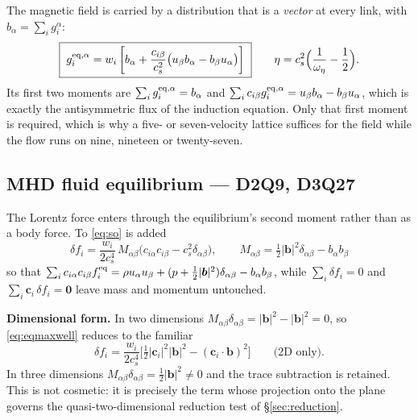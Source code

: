 \documentclass[11pt,a4paper]{article}
\newcommand{\cs}{c_s}
\newcommand{\ci}{\bm{c}_i}
\newcommand{\bb}{\bm{b}}
\begin{document}
The magnetic field is carried by a distribution that is a \emph{vector} at every
link, with $b_\alpha=\sum_i g_i^\alpha$:
\begin{equation}
  \boxed{\;
  g_i^{{\rm eq},\alpha} = w_i\left[b_\alpha
    + \frac{c_{i\beta}}{\cs^2}\big(u_\beta b_\alpha - b_\beta u_\alpha\big)\right]\;}
  \qquad
  \eta = \cs^2\Big(\frac{1}{\omega_\eta}-\frac12\Big).
  \label{eq:eqmag}
\end{equation}
Its first two moments are $\sum_i g_i^{\rm eq,\alpha}=b_\alpha$ and
$\sum_i c_{i\beta}g_i^{{\rm eq},\alpha}=u_\beta b_\alpha - b_\beta u_\alpha$,
which is exactly the antisymmetric flux of the induction equation. Only that
first moment is required, which is why a five- or seven-velocity lattice suffices
for the field while the flow runs on nine, nineteen or twenty-seven.

\subsection{MHD fluid equilibrium --- D2Q9, D3Q27}
\label{sec:eqmhd}

The Lorentz force enters through the equilibrium's second moment rather than as a
body force. To \eqref{eq:so} is added
\begin{equation}
  \boxed{\;
  \delta f_i = \frac{w_i}{2\cs^4}\,M_{\alpha\beta}
    \big(c_{i\alpha}c_{i\beta} - \cs^2\delta_{\alpha\beta}\big),
  \qquad
  M_{\alpha\beta} = \tfrac12|\bb|^2\delta_{\alpha\beta} - b_\alpha b_\beta \;}
  \label{eq:eqmaxwell}
\end{equation}
so that $\sum_i c_{i\alpha}c_{i\beta}f_i^{\rm eq}
= \rho u_\alpha u_\beta + (p+\tfrac12|\bb|^2)\delta_{\alpha\beta} - b_\alpha b_\beta$,
while $\sum_i\delta f_i=0$ and $\sum_i\ci\,\delta f_i=\bm0$ leave mass and
momentum untouched.

\medskip
\noindent\textbf{Dimensional form.} In two dimensions
$M_{\alpha\beta}\delta_{\alpha\beta}=|\bb|^2-|\bb|^2=0$, so \eqref{eq:eqmaxwell}
reduces to the familiar
\begin{equation}
  \delta f_i = \frac{w_i}{2\cs^4}
    \Big[\tfrac12|\ci|^2|\bb|^2 - (\ci\!\cdot\!\bb)^2\Big]
  \qquad\text{(2D only)} .
\end{equation}
In three dimensions $M_{\alpha\beta}\delta_{\alpha\beta}=\tfrac12|\bb|^2\neq0$ and
the trace subtraction is retained. This is not cosmetic: it is precisely the term
whose projection onto the plane governs the quasi-two-dimensional reduction test
of \S\ref{sec:reduction}.
\end{document}
